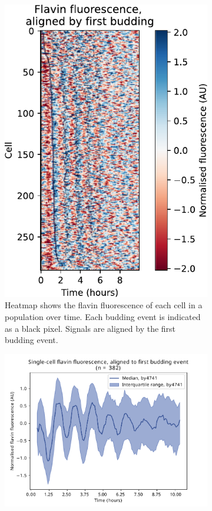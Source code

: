 \begin{figure}
  \begin{subfigure}[htpb]{0.4\textwidth}
   \centering
   \includegraphics[width=\textwidth]{by4741_491_7.pdf}
   \caption{
    Heatmap shows the flavin fluorescence of each cell in a population over time.
    Each budding event is indicated as a black pixel.
    Signals are aligned by the first budding event.
   }
   \label{fig:biology-by4741-sync-heatmap}
  \end{subfigure}%
  \begin{subfigure}[htpb]{0.4\textwidth}
   \centering
   \includegraphics[width=\textwidth]{by4741_491_6}

\end{subfigure}
\end{figure}
